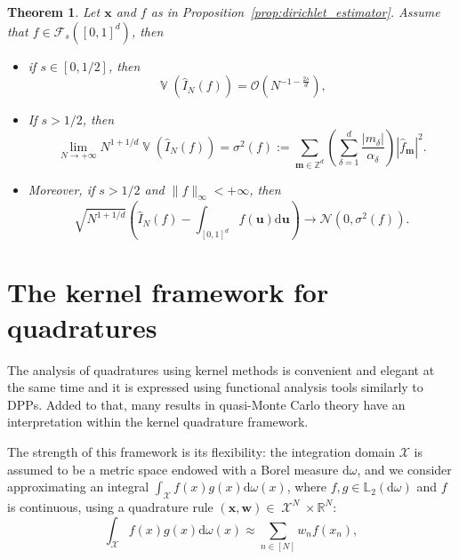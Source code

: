 \documentclass[twoside,11pt]{book}
\newtheorem{theorem}{Theorem}
\DeclareMathOperator{\Var}{\mathbb{V}}
\DeclareMathOperator{\X}{\mathcal{X}}
\begin{document}
\begin{theorem}
Let $\bm{x}$ and $f$ as in Proposition~\ref{prop:dirichlet_estimator}. Assume that $f \in \mathcal{F}_{s}([0,1]^{d})$, then
\begin{itemize}
\item if $s \in [0,1/2]$, then 
\begin{equation}
\Var (\hat{I}_{N}(f))  = \mathcal{O}(N^{-1-\frac{2s}{d}}),
\end{equation}
\item If $s>1/2$, then
\begin{equation}
\lim\limits_{N \rightarrow +\infty} N^{1+1/d} \Var (\hat{I}_{N}(f)) = \sigma^{2}(f) := \sum\limits_{\bm{m} \in \mathbb{Z}^{d}}(\sum\limits_{\delta = 1}^{d} \frac{|m_{\delta}|}{\alpha_{\delta}} ) |\hat{f}_{\bm{m}}|^{2}.
\end{equation}
\item Moreover, if $s>1/2$ and $ \|f\|_{\infty} < +\infty$, then
\begin{equation}
\sqrt{N^{1+1/d}} \left(\hat{I}_{N}(f) - \int_{[0,1]^{d}}f(\bm{u})\mathrm{d}\bm{u} \right) \rightarrow \mathcal{N}(0,\sigma^{2}(f)).
\end{equation}
\end{itemize}

\end{theorem}
\section{The kernel framework for quadratures}


The analysis of quadratures using kernel methods is convenient and elegant at the same time and it is expressed using functional analysis tools similarly to DPPs. Added to that, many results in quasi-Monte Carlo theory have an interpretation within the kernel quadrature framework. 

The strength of this framework is its flexibility: the integration domain $\mathcal{X}$ is assumed to be a metric space endowed with a Borel measure $\mathrm{d}\omega$, and we consider approximating an integral $\displaystyle \int_{\X} f(x)g(x)\mathrm{d}\omega(x)$, where $f,g \in \mathbb{L}_{2}(\mathrm{d}\omega)$ and $f$  is continuous, using a quadrature rule $(\bm{x}, \bm{w}) \in \X^{N} \times \mathbb{R}^{N}$:
\begin{equation}\label{eq:int_error}
\int_{\X} f(x)g(x)\mathrm{d}\omega(x) \approx \sum\limits_{n \in [N]} w_{n} f(x_{n}),
\end{equation}
\end{document}
